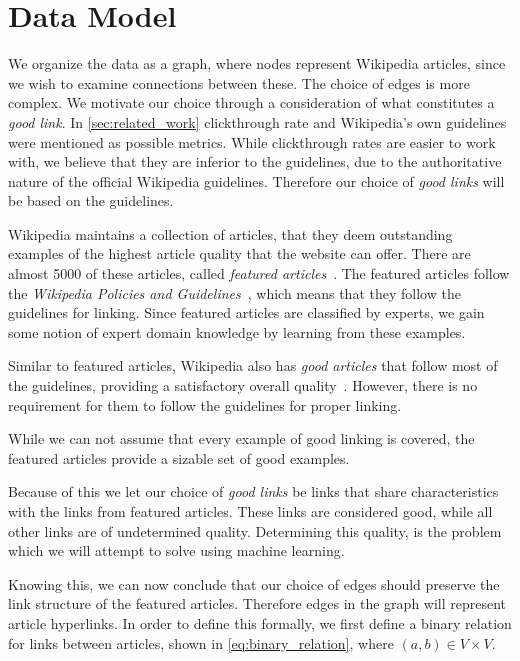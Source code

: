 \section{Data Model}\label{sec:choice_of_graph}
We organize the data as a graph, where nodes represent Wikipedia articles, since we wish to examine connections between these. The choice of edges is more complex. We motivate our choice through a consideration of what constitutes a \emph{good link}. In \cref{sec:related_work} clickthrough rate and Wikipedia's own guidelines were mentioned as possible metrics. While clickthrough rates are easier to work with, we believe that they are inferior to the guidelines, due to the authoritative nature of the official Wikipedia guidelines. Therefore our choice of \emph{good links} will be based on the guidelines.

Wikipedia maintains a collection of articles, that they deem outstanding examples of the highest article quality that the website can offer. There are almost 5000 of these articles, called \emph{featured articles}~\cite{wiki-featured-articles}. The featured articles follow the \emph{Wikipedia Policies and Guidelines}~\cite{wiki-editor-guidelines}, which means that they follow the guidelines for linking. Since featured articles are classified by experts, we gain some notion of expert domain knowledge by learning from these examples.

Similar to featured articles, Wikipedia also has \emph{good articles} that follow most of the guidelines, providing a satisfactory overall quality~\cite{wiki-good-articles}. However, there is no requirement for them to follow the guidelines for proper linking.

While we can not assume that every example of good linking is covered, the featured articles provide a sizable set of good examples. 

Because of this we let our choice of \emph{good links} be links that share characteristics with the links from featured articles. These links are considered good, while all other links are of undetermined quality. Determining this quality, is the problem which we will attempt to solve using machine learning.

Knowing this, we can now conclude that our choice of edges should preserve the link structure of the featured articles. Therefore edges in the graph will represent article hyperlinks. In order to define this formally, we first define a binary relation for links between articles, shown in \cref{eq:binary_relation}, where $(a,b) \in V \times V$. 

